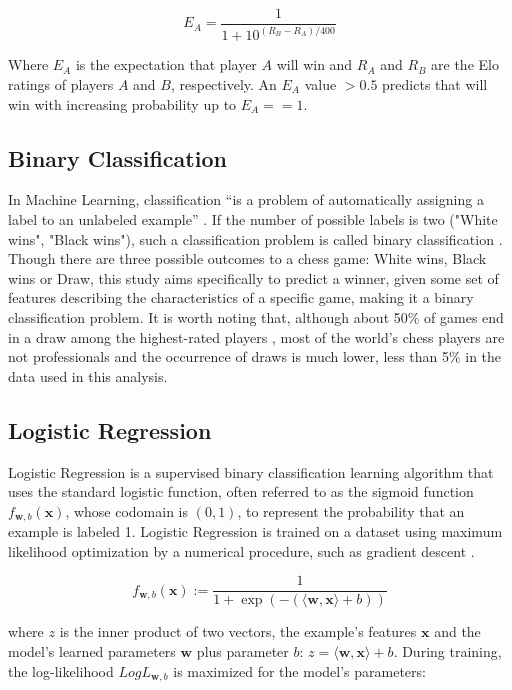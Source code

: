 \documentclass[12pt]{article}
\begin{document}
\[
E_A = \frac{1}{1 + 10^{(R_B - R_A)/400}}
\]

Where $E_A$ is the expectation that player $A$ will win and $R_A$ and $R_B$ are the Elo ratings of players $A$ and $B$, respectively. An $E_A$ value $> 0.5$ predicts that will win with increasing probability up to $E_A == 1$.

\subsection{Binary Classification}

In Machine Learning, classification ``is a problem of automatically assigning a label to an unlabeled example'' \cite[Chapter 2, Section 2.7]{100MLB}. If the number of possible labels is two ("White wins", "Black wins"), such a classification problem is called binary classification \cite{Allwein2000}. Though there are three possible outcomes to a chess game: White wins, Black wins or Draw, this study aims specifically to predict a winner, given some set of features describing the characteristics of a specific game, making it a binary classification problem. It is worth noting that, although about 50\% of games end in a draw among the highest-rated players \cite{chessBaseDraws}, most of the world's chess players are not professionals and the occurrence of draws is much lower, less than 5\% in the data used in this analysis.

\subsection{Logistic Regression}

Logistic Regression is a supervised binary classification learning algorithm that uses the standard logistic function, often referred to as the sigmoid function $f_{\textbf{w},b}(\textbf{x})$, whose codomain is $(0, 1)$, to represent the probability that an example is labeled 1. Logistic Regression is trained on a dataset using maximum likelihood optimization by a numerical procedure, such as gradient descent \cite[Chapter 9, Section 9.3]{ShalevShwartz2014}.

\[
f_{\textbf{w},b}(\textbf{x}) := \frac{1}{1 + \exp(-(\langle\textbf{w}, \textbf{x}\rangle + b))}
\]

where $z$ is the inner product of two vectors, the example's features $\textbf{x}$ and the model's learned parameters $\textbf{w}$ plus parameter $b$: $z = \langle\textbf{w}, \textbf{x}\rangle + b$. During training, the log-likelihood $LogL_{\textbf{w},b}$ is maximized for the model's parameters:
\end{document}
